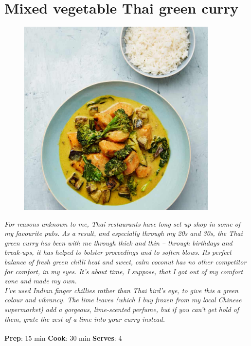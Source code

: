 \documentclass{book}
\begin{document}
\section{Mixed vegetable Thai green curry}
\begin{figure}
\centering\includegraphics[width=10cm,height=10cm,keepaspectratio]{Recipe_Pictures/Mixed_vegetable_Thai_green_curry.png}
\end{figure}
\emph{For reasons unknown to me, Thai restaurants have long set up shop in some of my favourite pubs. As a result, and especially through my 20s and 30s, the Thai green curry has been with me through thick and thin – through birthdays and break-ups, it has helped to bolster proceedings and to soften blows. Its perfect balance of fresh green chilli heat and sweet, calm coconut has no other competitor for comfort, in my eyes. It’s about time, I suppose, that I got out of my comfort zone and made my own.\\ 
I’ve used Indian finger chillies rather than Thai bird’s eye, to give this a green colour and vibrancy. The lime leaves (which I buy frozen from my local Chinese supermarket) add a gorgeous, lime-scented perfume, but if you can’t get hold of them, grate the zest of a lime into your curry instead.}\\\\ 
\textbf{Prep}: 15 min
\textbf{Cook}: 30 min
\textbf{Serves}: 4
\end{document}
